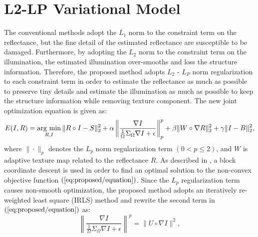 \section{L2-LP Variational Model} \label{sec:L2-LP}
The conventional methods adopt the $L_{1}$ norm to the constraint term on the reflectance, but the fine detail of the estimated reflectance are susceptible to be damaged. Furthermore, by adopting the $L_{2}$ norm to the constraint term on the illumination, the estimated illumination over-smooths and loss the structure information. Therefore, the proposed method adopts $L_{2}$ - $L_{P}$ norm regularization to each constraint term in order to estimate the reflectance as much as possible to preserve tiny details and estimate the illumination as much as possible to keep the structure information while removing texture component.
The new joint optimization equation is given as:
\begin{equation}
E(I, R) = \mathop{\rm arg~min}\limits_{R, I} \|R \circ I - S\|_{2}^{2} + \alpha \left \|\frac{\nabla{I}}{\frac{1}{\Omega}\Sigma_{\Omega}\nabla{I}+\epsilon}\right\|_{p}^{p} + \beta \|W \circ \nabla{R}\|_{2}^{2} + \gamma \|I - B\|_{2}^{2}, \label{eq:proposed/equation}
\end{equation}
where $\| \cdot \|_{p}$ denotes the $L_{p}$ norm regularization term $(0 < p \leq 2)$, and $W$ is adaptive texture map related to the reflectance $R$. As described in \cite{l2-lp}, a block coordinate descent \cite{block} is used in order to find an optimal solution to the non-convex objective function $(\ref{eq:proposed/equation})$. Since the $L_{p}$ regularization term causes non-smooth optimization, the proposed method adopts an iteratively re-weighted least square (IRLS) method \cite{iterate} and rewrite the second term in $(\ref{eq:proposed/equation})$ as:
\begin{equation}
\left \|\frac{\nabla{I}}{\frac{1}{\Omega}\Sigma_{\Omega}\nabla{I}+\epsilon}\right\|^{p} = \|U \circ \nabla{I}\|^{2}, \label{eq:approximation}
\end{equation}

